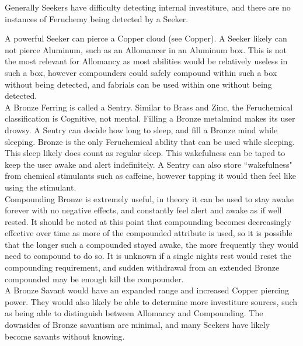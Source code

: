 \documentclass[conference]{IEEEtran}
\begin{document}
Generally Seekers have difficulty detecting internal investiture,\cite{seek-FE} and there are no instances of Feruchemy being detected by a Seeker. 

A powerful Seeker can pierce a Copper cloud (see Copper).\cite{TFE-CH31}
A Seeker likely can not pierce Aluminum, such as an Allomancer in an Aluminum box.\cite{OB-CH81}  This is not the most relevant for Allomancy as most abilities would be relatively useless in such a box, however compounders could safely compound within such a box without being detected, and fabrials can be used within one without being detected.\\

A Bronze Ferring is called a Sentry.\cite{ARS}  Similar to Brass and Zinc, the Feruchemical classification is Cognitive, not mental.\cite{FE-TB}  Filling a Bronze metalmind makes its user drowsy.\cite{ARS}  A Sentry can decide how long to sleep, and fill a Bronze mind while sleeping. Bronze is the only Feruchemical ability that can be used while sleeping.\cite{WoA-CH57} This sleep likely does count as regular sleep.\cite{TFE-CH22}  This wakefulness can be taped to keep the user awake and alert indefinitely.  A Sentry can also store ``wakefulness" from chemical stimulants such as caffeine, however tapping it would then feel like using the stimulant.\cite{BZ-FE-Chem}\\

Compounding Bronze is extremely useful, in theory it can be used to stay awake forever with no negative effects, and constantly feel alert and awake as if well rested.\cite{bronze-comp}  It should be noted at this point that compounding becomes decreasingly effective over time as more of the compounded attribute is used, so it is possible that the longer such a compounded stayed awake, the more frequently they would need to compound to do so.\cite{AoL-CH13}\cite{TFE-CH38}  It is unknown if a single nights rest would reset the compounding requirement, and sudden withdrawal from an extended Bronze compounded may be enough kill the compounder.\\

A Bronze Savant would have an expanded range and increased Copper piercing power.\cite{WoF}\cite{savant-pierce}\cite{seeker-savant-compound}  They would also likely be able to determine more investiture sources, such as being able to distinguish between Allomancy and Compounding.\cite{seeker-savant-compound}
The downsides of Bronze savantism are minimal, and many Seekers have likely become savants without knowing.\cite{WoF}\cite{savant-pierce}\\
\end{document}
